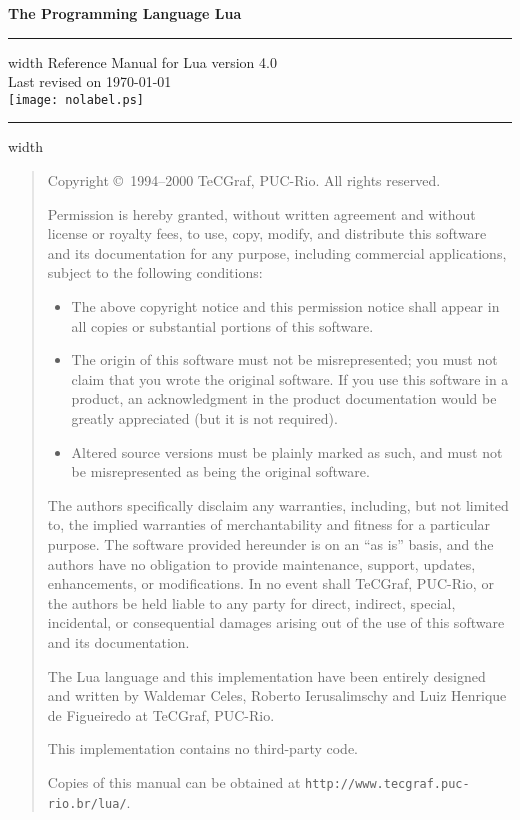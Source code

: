 \documentclass[11pt]{article}
\newcommand{\Version}{4.0}
\begin{document}
\thispagestyle{empty}
\pagestyle{empty}

{
\parindent=0pt
{\LARGE\bf
The Programming Language Lua}
\hfill
\vskip4pt \hrule height 4pt width \hsize \vskip4pt
\hfill
Reference Manual for Lua version \Version
\\
\null
\hfill
Last revised on \today
\\
\vfill
\centering
\texttt{[image: nolabel.ps]}
\vfill
\vskip4pt \hrule height 2pt width \hsize
}

\newpage
\begin{quotation}
\parskip=10pt
\footnotesize
\null\vfill

\noindent
Copyright \copyright\ 1994--2000 TeCGraf, PUC-Rio.  All rights reserved.

\noindent
Permission is hereby granted, without written agreement and without license
or royalty fees, to use, copy, modify, and distribute this software and its
documentation for any purpose, including commercial applications, subject to
the following conditions:
\begin{itemize}
\item The above copyright notice and this permission notice shall appear in all
   copies or substantial portions of this software.

\item The origin of this software must not be misrepresented; you must not
   claim that you wrote the original software. If you use this software in a
   product, an acknowledgment in the product documentation would be greatly
   appreciated (but it is not required).

\item Altered source versions must be plainly marked as such, and must not be
   misrepresented as being the original software.
\end{itemize}
The authors specifically disclaim any warranties, including, but not limited
to, the implied warranties of merchantability and fitness for a particular
purpose.  The software provided hereunder is on an ``as is'' basis, and the
authors have no obligation to provide maintenance, support, updates,
enhancements, or modifications.  In no event shall TeCGraf, PUC-Rio, or the
authors be held liable to any party for direct, indirect, special,
incidental, or consequential damages arising out of the use of this software
and its documentation.

\noindent
The Lua language and this implementation have been entirely designed and
written by Waldemar Celes, Roberto Ierusalimschy and Luiz Henrique de
Figueiredo at TeCGraf, PUC-Rio.

\noindent
This implementation contains no third-party code.

\noindent
Copies of this manual can be obtained at
\verb|http://www.tecgraf.puc-rio.br/lua/|.
\end{quotation}
\newpage
\end{document}
